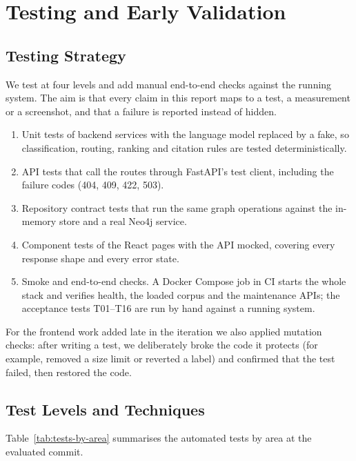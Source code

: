 \chapter{Testing and Early Validation}

\section{Testing Strategy}

We test at four levels and add manual end-to-end checks against the running system. The aim is that every claim in this report maps to a test, a measurement or a screenshot, and that a failure is reported instead of hidden.

\begin{enumerate}
\item Unit tests of backend services with the language model replaced by a fake, so classification, routing, ranking and citation rules are tested deterministically.
\item API tests that call the routes through FastAPI's test client, including the failure codes (404, 409, 422, 503).
\item Repository contract tests that run the same graph operations against the in-memory store and a real Neo4j service.
\item Component tests of the React pages with the API mocked, covering every response shape and every error state.
\item Smoke and end-to-end checks. A Docker Compose job in CI starts the whole stack and verifies health, the loaded corpus and the maintenance APIs; the acceptance tests T01--T16 are run by hand against a running system.
\end{enumerate}

For the frontend work added late in the iteration we also applied mutation checks: after writing a test, we deliberately broke the code it protects (for example, removed a size limit or reverted a label) and confirmed that the test failed, then restored the code.

\section{Test Levels and Techniques}

Table~\ref{tab:tests-by-area} summarises the automated tests by area at the evaluated commit.

